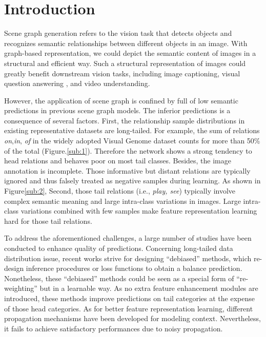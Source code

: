 \documentclass[runningheads]{llncs}
\begin{document}
\section{Introduction}
Scene graph generation refers to the vision task that detects objects and
recognizes semantic relationships between different objects in an image. With
graph-based representation, we could depict the semantic content of images in a
structural and efficient way. Such a structural representation of images could
greatly benefit downstream vision tasks, including image
captioning\cite{ic1}\cite{ic3}, visual question answering
\cite{vqa3}\cite{vqa2}\cite{vqa1}, and video understanding\cite{va1}.

However, the application of scene graph is confined by full of low semantic
predictions in previous scene graph models. The inferior predictions is a
consequence of several factors. First, the relationship sample distributions in
existing representative datasets are long-tailed. For example, the sum of
relations \textit{on},\textit{in}, \textit{of} in the widely adopted Visual
Genome dataset\cite{visualgenome} counts for more than 50\% of the total
(Figure.\ref{sub:1}).  Therefore the network shows a strong tendency to head
relations and behaves poor on most tail classes. Besides, the image annotation
is incomplete. Those informative but distant relations are typically ignored
and thus falsely treated as negative samples during learning. As shown in
Figure\ref{sub:2}, Second, those tail relations (i.e., \textit{play, see})
typically involve complex semantic meaning and large intra-class variations in
images. Large intra-class variations combined with few samples make feature
representation learning hard for those tail relations.

To address the aforementioned challenges, a large number of studies have been
conducted to enhance quality of predictions. Concerning long-tailed data
distribution issue,  recent works strive for designing ``debiased'' methods,
which re-design inference procedures or loss functions to obtain a balance
prediction. Nonetheless, these ``debiased'' methods could be seen as a special
form of ``re-weighting'' but in a learnable way. As no extra feature
enhancement modules are introduced, these methods improve predictions on tail
categories at the expense of those head categories. As for better feature
representation learning, different propagation mechanisms have been developed
for modeling context\cite{bgnn}. Nevertheless, it fails to achieve satisfactory
performances due to noisy propagation.
\end{document}
